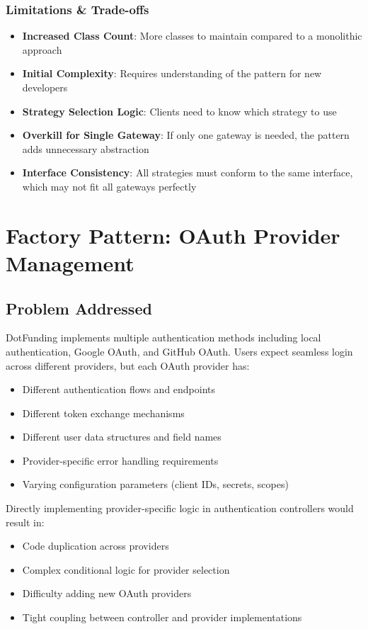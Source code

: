 \documentclass[a4paper,12pt]{report}
\begin{document}
\subsubsection{Limitations \& Trade-offs}

\begin{itemize}
    \item \textbf{Increased Class Count}: More classes to maintain compared to a monolithic approach
    \item \textbf{Initial Complexity}: Requires understanding of the pattern for new developers
    \item \textbf{Strategy Selection Logic}: Clients need to know which strategy to use
    \item \textbf{Overkill for Single Gateway}: If only one gateway is needed, the pattern adds unnecessary abstraction
    \item \textbf{Interface Consistency}: All strategies must conform to the same interface, which may not fit all gateways perfectly
\end{itemize}



\section{Factory Pattern: OAuth Provider Management}

\subsection{Problem Addressed}

DotFunding implements multiple authentication methods including local authentication, Google OAuth, and GitHub OAuth. Users expect seamless login across different providers, but each OAuth provider has:

\begin{itemize}
    \item Different authentication flows and endpoints
    \item Different token exchange mechanisms
    \item Different user data structures and field names
    \item Provider-specific error handling requirements
    \item Varying configuration parameters (client IDs, secrets, scopes)
\end{itemize}

Directly implementing provider-specific logic in authentication controllers would result in:
\begin{itemize}
    \item Code duplication across providers
    \item Complex conditional logic for provider selection
    \item Difficulty adding new OAuth providers
    \item Tight coupling between controller and provider implementations
\end{itemize}
\end{document}
